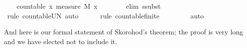\documentclass{article}
\theoremstyle{definition}
\begin{document}
\begin{isabellebody}
\ \ \isamarkupfalse%
\ {\isachardoublequoteopen}countable\ {\isacharbraceleft}x{\isachardot}\ measure\ M\ {\isacharbraceleft}x{\isacharbraceright}\ {\isachargreater}\ {}{\isacharbraceright}{\isachardoublequoteclose}\isanewline
\ \ \ \ \isamarkupfalse%
\ {\isacharparenleft}elim\ ssubst{\isacharparenright}\isanewline
\ \ \ \ \isamarkupfalse%
\ {\isacharparenleft}rule\ countable{\isacharunderscore}UN{\isacharcomma}\ auto{\isacharparenright}\isanewline
\ \ \ \ \isamarkupfalse%
\ {\isacharparenleft}rule\ countable{\isacharunderscore}finite{\isacharparenright}\isanewline
\ \ \ \ \isamarkupfalse%
\ {\isacharasterisk}{\isacharasterisk}\ \isamarkupfalse%
\ auto\isanewline
{}\isamarkupfalse%
\end{isabellebody}

\medskip

And here is our formal statement of Skorohod's theorem; the proof is very long and we have elected not to include it.

\medskip
\end{document}
